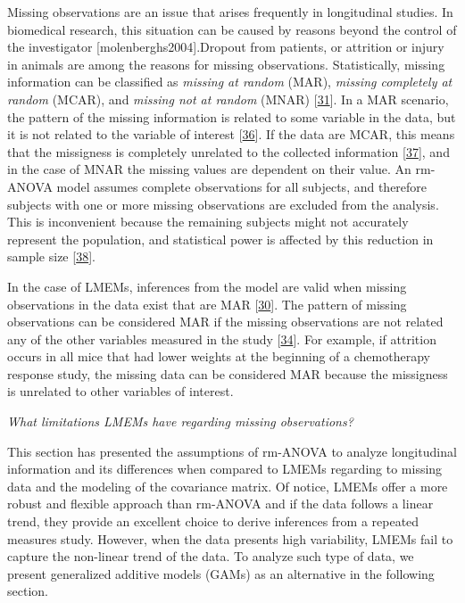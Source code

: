 \documentclass[
]{article}
\begin{document}
Missing observations are an issue that arises frequently in longitudinal
studies. In biomedical research, this situation can be caused by reasons
beyond the control of the investigator {[}molenberghs2004{]}.Dropout
from patients, or attrition or injury in animals are among the reasons
for missing observations. Statistically, missing information can be
classified as \emph{missing at random} (MAR), \emph{missing completely
at random} (MCAR), and \emph{missing not at random} (MNAR)
{[}\protect\hyperlink{ref-weiss2005}{31}{]}. In a MAR scenario, the
pattern of the missing information is related to some variable in the
data, but it is not related to the variable of interest
{[}\protect\hyperlink{ref-scheffer2002}{36}{]}. If the data are MCAR,
this means that the missigness is completely unrelated to the collected
information {[}\protect\hyperlink{ref-potthoff2006}{37}{]}, and in the
case of MNAR the missing values are dependent on their value. An
rm-ANOVA model assumes complete observations for all subjects, and
therefore subjects with one or more missing observations are excluded
from the analysis. This is inconvenient because the remaining subjects
might not accurately represent the population, and statistical power is
affected by this reduction in sample size
{[}\protect\hyperlink{ref-ma2012}{38}{]}.

In the case of LMEMs, inferences from the model are valid when missing
observations in the data exist that are MAR
{[}\protect\hyperlink{ref-west2014}{30}{]}. The pattern of missing
observations can be considered MAR if the missing observations are not
related any of the other variables measured in the study
{[}\protect\hyperlink{ref-maxwell2017}{34}{]}. For example, if attrition
occurs in all mice that had lower weights at the beginning of a
chemotherapy response study, the missing data can be considered MAR
because the missigness is unrelated to other variables of interest.

\emph{What limitations LMEMs have regarding missing observations?}

This section has presented the assumptions of rm-ANOVA to analyze
longitudinal information and its differences when compared to LMEMs
regarding to missing data and the modeling of the covariance matrix. Of
notice, LMEMs offer a more robust and flexible approach than rm-ANOVA
and if the data follows a linear trend, they provide an excellent choice
to derive inferences from a repeated measures study. However, when the
data presents high variability, LMEMs fail to capture the non-linear
trend of the data. To analyze such type of data, we present generalized
additive models (GAMs) as an alternative in the following section.
\end{document}
